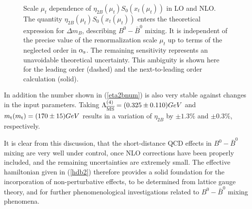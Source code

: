 \begin{figure}[htb]
\vspace{0.15in}
\centerline{
\epsfysize=4.5in
}
\vspace{0.15in}
\caption[]{
Scale $\mu_t$ dependence of $\eta_{2B}(\mu_t) S_0(x_t(\mu_t))$ in LO and
NLO.
The quantity $\eta_{2B}(\mu_t) S_0(x_t(\mu_t))$ enters the theoretical
expression for $\Delta m_B$, describing $B^0-\bar B^0$ mixing. It is
independent of the precise value of the renormalization scale $\mu_t$
up to terms of the neglected order in $\alpha_{\rm s}$. The remaining
sensitivity represents an unavoidable theoretical uncertainty.
This ambiguity is shown here for the leading order (dashed) and
the next-to-leading order calculation (solid).
\label{fig:eta2mut}}
\end{figure}

In addition the number shown in (\ref{eta2bnum}) is also very stable
against changes in the input parameters. Taking $\Lambda_{\overline{\rm MS}}^{(4)}=(0.325\pm
0.110) GeV$ and $m_{\rm t}(m_{\rm t})=(170\pm 15)GeV$ results in a variation of
$\eta_{2B}$ by $\pm 1.3\%$ and $\pm 0.3\%$, respectively.

It is clear from this discussion, that the short-distance QCD effects
in $B^0-\bar B^0$ mixing are very well under control, once NLO
corrections have been properly included, and the remaining
uncertainties are extremely small. The effective hamiltonian given in
(\ref{hdb2}) therefore provides a solid foundation for the
incorporation of non-perturbative effects, to be determined from
lattice gauge theory, and for further phenomenological investigations
related to $B^0-\bar B^0$ mixing phenomena.
